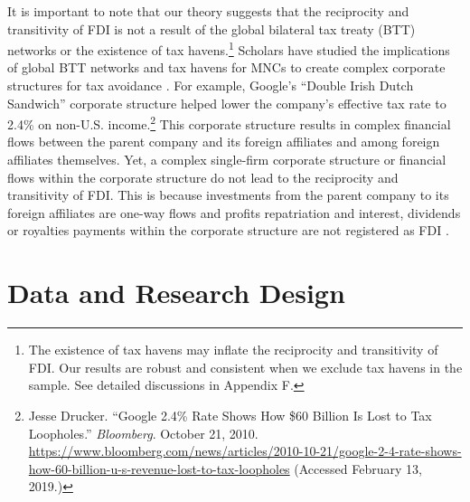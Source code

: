 \documentclass[reqno,onecolumn,letterpaper,12pt]{article}
\begin{document}
It is important to note that our theory suggests that the reciprocity and transitivity of FDI is not a result of the global bilateral tax treaty (BTT) networks or the existence of tax havens.\footnote{The existence of tax havens may inflate the reciprocity and transitivity of FDI. Our results are robust and consistent when we exclude tax havens in the sample. See detailed discussions in Appendix F.} Scholars have studied the implications of global BTT networks and tax havens for MNCs to create complex corporate structures for tax avoidance \citep[e.g.,][]{Arel-Bundock:2017a}. For example, Google's ``Double Irish Dutch Sandwich'' corporate structure helped lower the company's effective tax rate to 2.4\% on non-U.S. income.\footnote{Jesse Drucker. ``Google 2.4\% Rate Shows How \$60 Billion Is Lost to Tax Loopholes.'' \emph{Bloomberg}. October 21, 2010. \url{https://www.bloomberg.com/news/articles/2010-10-21/google-2-4-rate-shows-how-60-billion-u-s-revenue-lost-to-tax-loopholes} (Accessed February 13, 2019.) } This corporate structure results in complex financial flows between the parent company and its foreign affiliates and among foreign affiliates themselves. Yet, a complex single-firm corporate structure or financial flows within the corporate structure do not lead to the reciprocity and transitivity of FDI. This is because investments from the parent company to its foreign affiliates are one-way flows and profits repatriation and interest, dividends or royalties payments within the corporate structure are not registered as FDI \citep[see,][]{Kerner:2014}.

\section{Data and Research Design}

\end{document}
